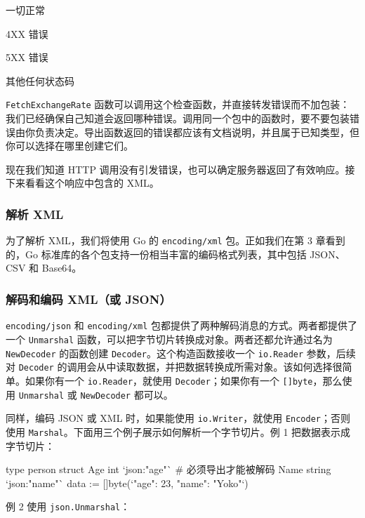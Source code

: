 \begin{codeannotations}
\item 一切正常
\item 4XX 错误
\item 5XX 错误
\item 其他任何状态码
\end{codeannotations}

\texttt{FetchExchangeRate} 函数可以调用这个检查函数，并直接转发错误而不加包装：我们已经确保自己知道会返回哪种错误。调用同一个包中的函数时，要不要包装错误由你负责决定。导出函数返回的错误都应该有文档说明，并且属于已知类型，但你可以选择在哪里创建它们。

现在我们知道 HTTP 调用没有引发错误，也可以确定服务器返回了有效响应。接下来看看这个响应中包含的 XML。

\subsubsection*{解析 XML}

为了解析 XML，我们将使用 Go 的 \texttt{encoding/xml} 包。正如我们在第 3 章看到的，Go 标准库的各个包支持一份相当丰富的编码格式列表，其中包括 JSON、CSV 和 Base64。

\subsubsection*{解码和编码 XML（或 JSON）}

\texttt{encoding/json} 和 \texttt{encoding/xml} 包都提供了两种解码消息的方式。两者都提供了一个 \texttt{Unmarshal} 函数，可以把字节切片转换成对象。两者还都允许通过名为 \texttt{NewDecoder} 的函数创建 \texttt{Decoder}。这个构造函数接收一个 \texttt{io.Reader} 参数，后续对 \texttt{Decoder} 的调用会从中读取数据，并把数据转换成所需对象。该如何选择很简单。如果你有一个 \texttt{io.Reader}，就使用 \texttt{Decoder}；如果你有一个 \texttt{[]byte}，那么使用 \texttt{Unmarshal} 或 \texttt{NewDecoder} 都可以。

同样，编码 JSON 或 XML 时，如果能使用 \texttt{io.Writer}，就使用 \texttt{Encoder}；否则使用 \texttt{Marshal}。下面用三个例子展示如何解析一个字节切片。例 1 把数据表示成字节切片：

\begin{gocode}[]
type person struct {
    Age int     `json:"age"` # 必须导出才能被解码
    Name string `json:"name"`
}
data := []byte(`{"age": 23, "name": "Yoko"}`)
\end{gocode}

例 2 使用 \texttt{json.Unmarshal}：


